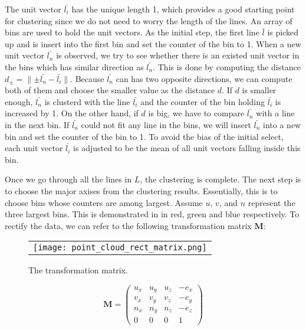 The unit vector $\bar{l_i}$ has the unique length 1, which provides a good starting point 
for clustering since we do not need to worry the length of the lines. 
An array of bins are used to hold the unit vectors.
As the initial step, the first line $\bar{l}$ is picked up and is insert into the 
first bin and set the counter of the bin to 1.
When a new unit vector $\bar{l_n}$ is observed, we try to see whether there is an
existed unit vector in the bins which has similar direction as $\bar{l_n}$. This is
done by computing the distance $d_{\pm}=\parallel \pm\bar{l_n} - \bar{l_i} \parallel$.
Because $\bar{l_n}$ can has two opposite directions, we can compute both of them and
choose the smaller value as the distance $d$. If $d$ is smaller enough, $\bar{l_n}$
is clusterd with the line $\bar{l_i}$ and the counter of the bin holding $\bar{l_i}$
is increased by 1. On the other hand, if $d$ is big, we have to compare $\bar{l_n}$
with a line in the next bin. If $\bar{l_n}$ could not fit any line in the bins, we
will insert $\bar{l_n}$ into a new bin and set the counter of the bin to 1. 
To avoid the bias of the initial select, each unit vector $\bar{l_i}$ is
adjusted to be the mean of all unit vectors falling inside this bin. 

Once we go through all the lines in $L$, the clustering is complete. 
The next step is to choose the major axises from the clustering results. 
Essentially, this is to choose bins whose counters are among largest. 
Assume $u$, $v$, and $n$ represent the three largest bins. This is demonstrated in
 in red, green and blue respectively. To rectify the data,
we can refer to the following transformation matrix $\mathbf{M}$:
\begin{figure}[htbp]
\begin{center}
\begin{tabular}{c}
\texttt{[image: point\_cloud\_rect\_matrix.png]}
\end{tabular}
\end{center}
\caption{ The transformation matrix. }
\label{fig:pc_rect_matrix}
\end{figure}

\begin{equation*}
\mathbf{M} = \left(
\begin{array}{cccc}
u_x & u_y & u_z & -e_x \\
v_x & v_y & v_z & -e_y \\
n_x & n_y & n_z & -e_z \\
  0 &   0 &   0 &    1 
\end{array} \right)
\end{equation*}

